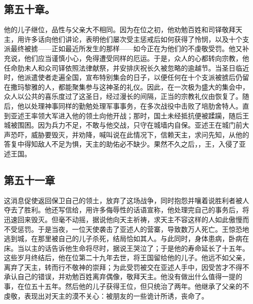 
\subsection{第五十章。}

他的儿子继位，品性与父亲大不相同。因为在位之初，他劝勉百姓和司铎敬拜天主，用许多话向他们讲论，表明他们屡次受主惩戒后如何获得了怜悯，以及十个支派最终被掳——正如最近所发生的那样——如今正在为他们的不虔敬受罚。他又补充说，他们应当谨慎小心，免得遭受同样的厄运。于是，众人的心都转向宗教，他任命肋未人和众司铎依照法律献祭，并安排庆祝长久被忽略的逾越节。当圣日临近时，他派遣使者走遍全国，宣布特别集会的日子，以便任何在十个支派被掳后仍留在撒玛黎雅的人，都能聚集参与这神圣的礼仪。因此，在一次极为盛大的集会中，众人以公共的喜乐度过了这圣日，经过漫长的间隔，正当的宗教礼仪由恢复了。随后，他以处理神事同样的勤勉处理军事事务，在多次战役中击败了培肋舍特人。直到亚述王率领大军进入他的领土向他开战；那时，国土未经抵抗便被蹂躏，随后王城被围困。因为兵力不足，不敢与他交战，只守在城墙内自保。亚述王在城门前大声恐吓，威胁要毁灭，并劝降，喊叫说在此情况下，信赖天主，求问先知，从他的答复中得知敌人不足为惧，天主的助佑必不缺少。果然不久之后，，王，入侵了亚述王国。\par


\subsection{第五十一章}

这消息促使返回保卫自己的领土，放弃了这场战争，同时抱怨并嚷着说胜利者被人夺去了胜利。他还写信给，用许多侮辱性的话语宣称，他处理完自己的事务后，将迅速回来毁灭。但毫不动摇，据说他向天主祈祷，求天主不容这样的人如此傲慢而不受惩罚。于是当夜，一位天使袭击了亚述人的营寨，导致数万人死亡。王惊恐地逃到城，在那里被自己的儿子杀死，结局恰如其人。与此同时，身体患病，卧病在床。当以主的话告诉他生命将尽时，据说王哭泣了；于是他的寿命延长了十五年。这些岁月终结后，他在位第二十九年去世，将王国留给他的儿子。他远不如父亲，离弃了天主，转而行不敬神的崇拜；为此受罚被交在亚述人手中，因受苦才不得不承认自己的错误，并劝勉百姓离弃偶像，敬拜天主。他没有做出什么值得一提的事，在位五十五年。然后他的儿子获得王位，但只统治了两年。他继承了父亲的不虔敬，表现出对天主的漠不关心：被朋友的一些诡计所诱，丧命了。\par

